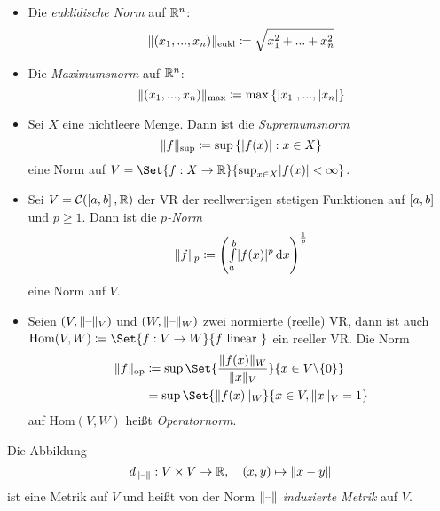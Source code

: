 \documentclass{cheat-sheet}
\begin{document}
\begin{bem}
  \begin{itemize}
    \item Die \emph{euklidische Norm} auf $\mathbb{R}^n$:
    \[ \lVert(x_1, ..., x_n)\rVert_{\text{eukl}} \coloneqq \sqrt{x_1^2 + ... + x_n^2} \]
    \item Die \emph{Maximumsnorm} auf $\mathbb{R}^n$:
    \[ \lVert(x_1, ..., x_n)\rVert_{\text{max}} \coloneqq \max \left\{ \lvert x_1\rvert, ..., \lvert x_n\rvert \right\} \]
    \item Sei $X$ eine nichtleere Menge. Dann ist die \emph{Supremumsnorm}
    \[ \lVert f\rVert_{\text{sup}} \coloneqq \sup\left\{ \lvert f(x)\rvert : x \in X \right\} \]
    eine Norm auf $V = \Set{ f : X \to \R }{ \sup_{x \in X} \abs{f(x)} < \infty }$.
    \item Sei $V = \mathcal{C}(\left[ a, b \right], \mathbb{R})$ der VR der reellwertigen stetigen Funktionen auf $\left[ a, b \right]$ und $p \ge 1$. Dann ist die \emph{$p$-Norm}
    \[ \lVert f\rVert_{p} \coloneqq \left( {\textstyle \int\limits_{a}^{b}} \lvert f(x)\rvert^p \,\mathrm{d} x \right)^{\frac{1}{p}} \]
    eine Norm auf $V$.
    \item Seien $(V, \lVert\text{--}\rVert_V)$ und $(W, \lVert\text{--}\rVert_W)$ zwei normierte (reelle) VR, dann ist auch $\mathrm{Hom}(V, W) \coloneqq \Set{ f : V \to W }{ f \text{ linear } }$ ein reeller VR. Die Norm
    \begin{align*}
      \norm{f}_{\text{op}} &\coloneqq \sup \Set{ \frac{ \norm{f(x)}_W }{ \norm{x}_V } }{ x \in V \backslash \{ 0 \} }\\
        &= \sup \Set{ \norm{f(x)}_W }{ x \in V, \norm{x}_V = 1 }
    \end{align*}
    auf $\mathrm{Hom}(V, W)$ heißt \emph{Operatornorm}.
  \end{itemize}
\end{bem}


\begin{defn}
  Die Abbildung
  \[ d_{\lVert\text{--}\rVert} : V \times V \to \mathbb{R},\quad (x, y) \mapsto \lVert x - y\rVert \]
  ist eine Metrik auf $V$ und heißt von der Norm $\lVert\text{--}\rVert$ \emph{induzierte Metrik} auf $V$.
\end{defn}
\end{document}
